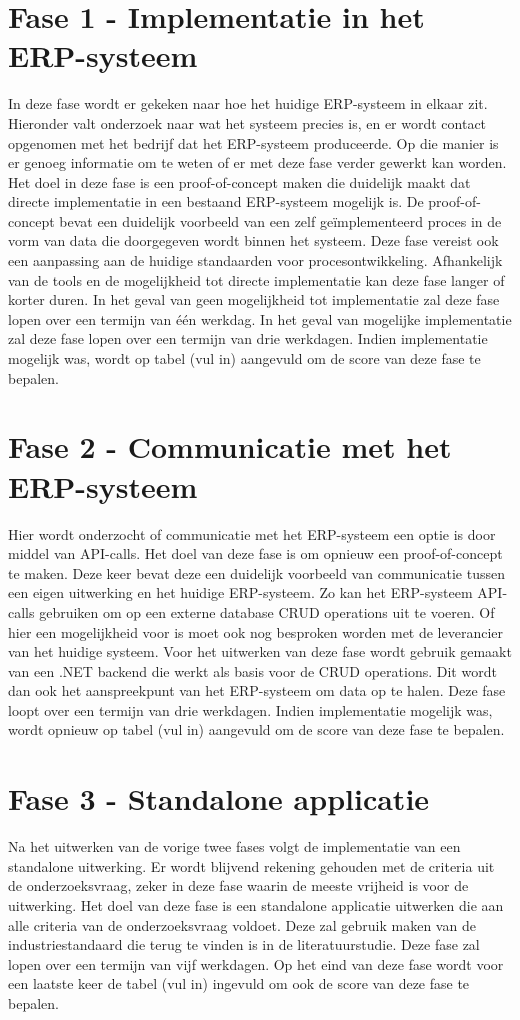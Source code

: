 \section{Fase 1 - Implementatie in het ERP-systeem}
In deze fase wordt er gekeken naar hoe het huidige ERP-systeem in elkaar zit. Hieronder valt onderzoek naar wat het systeem precies is, en er wordt contact opgenomen met het bedrijf dat het ERP-systeem produceerde. Op die manier is er genoeg informatie om te weten of er met deze fase verder gewerkt kan worden. Het doel in deze fase is een proof-of-concept maken die duidelijk maakt dat directe implementatie in een bestaand ERP-systeem mogelijk is. De proof-of-concept bevat een duidelijk voorbeeld van een zelf geïmplementeerd proces in de vorm van data die doorgegeven wordt binnen het systeem. Deze fase vereist ook een aanpassing aan de huidige standaarden voor procesontwikkeling. Afhankelijk van de tools en de mogelijkheid tot directe implementatie kan deze fase langer of korter duren. In het geval van geen mogelijkheid tot implementatie zal deze fase lopen over een termijn van één werkdag. In het geval van mogelijke implementatie zal deze fase lopen over een termijn van drie werkdagen. Indien implementatie mogelijk was, wordt op tabel (vul in) aangevuld om de score van deze fase te bepalen.
\section{Fase 2 - Communicatie met het ERP-systeem}
Hier wordt onderzocht of communicatie met het ERP-systeem een optie is door middel van API-calls. Het doel van deze fase is om opnieuw een proof-of-concept te maken. Deze keer bevat deze een duidelijk voorbeeld van communicatie tussen een eigen uitwerking en het huidige ERP-systeem. Zo kan het ERP-systeem API-calls gebruiken om op een externe database CRUD operations uit te voeren. Of hier een mogelijkheid voor is moet ook nog besproken worden met de leverancier van het huidige systeem. Voor het uitwerken van deze fase wordt gebruik gemaakt van een .NET backend die werkt als basis voor de CRUD operations. Dit wordt dan ook het aanspreekpunt van het ERP-systeem om data op te halen. Deze fase loopt over een termijn van drie werkdagen. Indien implementatie mogelijk was, wordt opnieuw op tabel (vul in) aangevuld om de score van deze fase te bepalen.
\section{Fase 3 - Standalone applicatie}
Na het uitwerken van de vorige twee fases volgt de implementatie van een standalone uitwerking. Er wordt blijvend rekening gehouden met de criteria uit de onderzoeksvraag, zeker in deze fase waarin de meeste vrijheid is voor de uitwerking. Het doel van deze fase is een standalone applicatie uitwerken die aan alle criteria van de onderzoeksvraag voldoet. Deze zal gebruik maken van de industriestandaard die terug te vinden is in de literatuurstudie. Deze fase zal lopen over een termijn van vijf werkdagen. Op het eind van deze fase wordt voor een laatste keer de tabel (vul in) ingevuld om ook de score van deze fase te bepalen.


